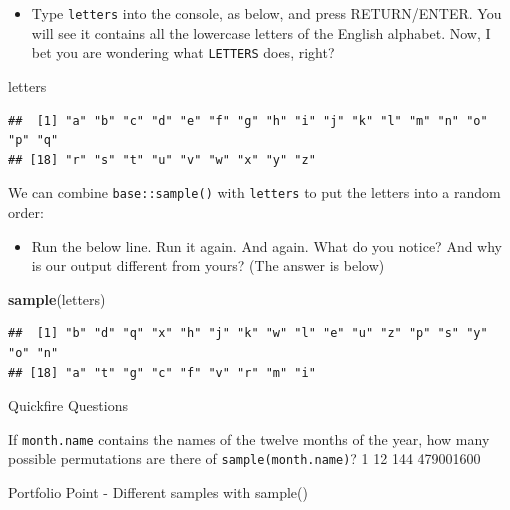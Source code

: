 \documentclass[]{book}
\newenvironment{Shaded}{\begin{snugshade}}{\end{snugshade}}
\newcommand{\KeywordTok}[1]{\textcolor[rgb]{0.13,0.29,0.53}{\textbf{#1}}}
\newcommand{\NormalTok}[1]{#1}
\providecommand{\tightlist}{%
  \setlength{\itemsep}{0pt}\setlength{\parskip}{0pt}}
\begin{document}
\begin{itemize}
\tightlist
\item
  Type \texttt{letters} into the console, as below, and press RETURN/ENTER. You will see it contains all the lowercase letters of the English alphabet. Now, I bet you are wondering what \texttt{LETTERS} does, right?
\end{itemize}

\begin{Shaded}
\begin{Highlighting}[]
\NormalTok{letters}
\end{Highlighting}
\end{Shaded}

\begin{verbatim}
##  [1] "a" "b" "c" "d" "e" "f" "g" "h" "i" "j" "k" "l" "m" "n" "o" "p" "q"
## [18] "r" "s" "t" "u" "v" "w" "x" "y" "z"
\end{verbatim}

We can combine \texttt{base::sample()} with \texttt{letters} to put the letters into a random order:

\begin{itemize}
\tightlist
\item
  Run the below line. Run it again. And again. What do you notice? And why is our output different from yours? (The answer is below)
\end{itemize}

\begin{Shaded}
\begin{Highlighting}[]
\KeywordTok{sample}\NormalTok{(letters)}
\end{Highlighting}
\end{Shaded}

\begin{verbatim}
##  [1] "b" "d" "q" "x" "h" "j" "k" "w" "l" "e" "u" "z" "p" "s" "y" "o" "n"
## [18] "a" "t" "g" "c" "f" "v" "r" "m" "i"
\end{verbatim}

{Quickfire Questions}

If \texttt{month.name} contains the names of the twelve months of the year, how many possible permutations are there of \texttt{sample(month.name)}? 1 12 144 479001600

Portfolio Point - Different samples with sample()
\end{document}

